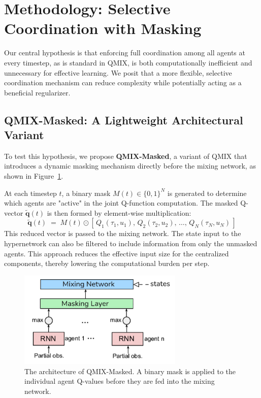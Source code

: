 \documentclass[../Main.tex]{subfiles}
\begin{document}
\section{Methodology: Selective Coordination with Masking}

Our central hypothesis is that enforcing full coordination among all agents at every timestep, as is standard in QMIX, is both computationally inefficient and unnecessary for effective learning. We posit that a more flexible, selective coordination mechanism can reduce complexity while potentially acting as a beneficial regularizer.

\subsection{QMIX-Masked: A Lightweight Architectural Variant}
To test this hypothesis, we propose \textbf{QMIX-Masked}, a variant of QMIX that introduces a dynamic masking mechanism directly before the mixing network, as shown in Figure~\ref{fig:qmix_masked_arch}.

At each timestep \(t\), a binary mask \(M(t) \in \{0,1\}^N\) is generated to determine which agents are "active" in the joint Q-function computation. The masked Q-vector \(\widetilde{\mathbf{q}}(t)\) is then formed by element-wise multiplication:
\[
\widetilde{\mathbf{q}}(t) \;=\; M(t) \odot [\,Q_1(\tau_1,u_1),\,Q_2(\tau_2,u_2),\,\dots,\,Q_N(\tau_N,u_N)\,]
\]
This reduced vector is passed to the mixing network. The state input to the hypernetwork can also be filtered to include information from only the unmasked agents. This approach reduces the effective input size for the centralized components, thereby lowering the computational burden per step.

\begin{figure}[H]
    \centering
    \includegraphics[width=0.7\textwidth]{img/masked-qmix.png}
    \caption{The architecture of QMIX-Masked. A binary mask is applied to the individual agent Q-values before they are fed into the mixing network.}
    \label{fig:qmix_masked_arch}
\end{figure}
\end{document}
